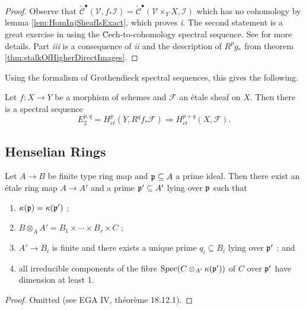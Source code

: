 \begin{proof}
Observe that $\check{\mathcal{C}}^\bullet(\mathcal{V}, f_*\mathcal{I}) = \check{\mathcal{C}}^\bullet(\mathcal{V}\times_Y X, \mathcal{I})$ which has no cohomology by lemma \ref{lem:HomInjSheafIsExact}, which proves {\it i}. The second statement is a great exercise in using the \u Cech-to-cohomology spectral sequence. See \cite{Stacks} for more details. Part {\it iii} is a consequence of {\it ii} and the description of $R^pg_*$ from theorem \ref{thm:stalkOfHigherDirectImages}. 
\end{proof}

Using the formalism of Grothendieck spectral sequences, this gives the following.

\begin{proposition}
Let $f: X \to Y$ be a morphism of schemes and $\mathcal{F}$ an \'etale sheaf on $X$. Then there is a spectral sequence
$$
E_2^{p,q} = H_{et}^p(Y, R^qf_*\mathcal{F}) \Rightarrow H_{et}^{p+q}(X, \mathcal{F}).
$$
\end{proposition}

\subsection{Henselian Rings}

\begin{theorem} 
Let $A\to B$ be finite type ring map and $\frak p \subseteq A$ a prime ideal. Then there exist an \'etale ring map $A \to A'$ and a prime $\frak p' \subseteq A'$ lying over $\frak p$ such that 
\begin{enumerate}
\item 
$\kappa(\frak p) = \kappa(\frak p')$ ;
\item 
$ B \otimes_A A' = B_1\times \cdots \times B_r \times C$ ;
\item 
$ A'\to B_i$ is finite and there exists a unique prime $q_i\subseteq B_i$ lying over $\frak p'$ ; and
\item 
all irreducible components of the fibre $\text{Spec}(C\otimes_{A'} \kappa(\frak p'))$ of $C$ over $\frak p'$ have dimension at least 1.
\end{enumerate}
\end{theorem}

\begin{proof}
Omitted (see EGA IV, th\'eor\`eme 18.12.1).
\end{proof}


